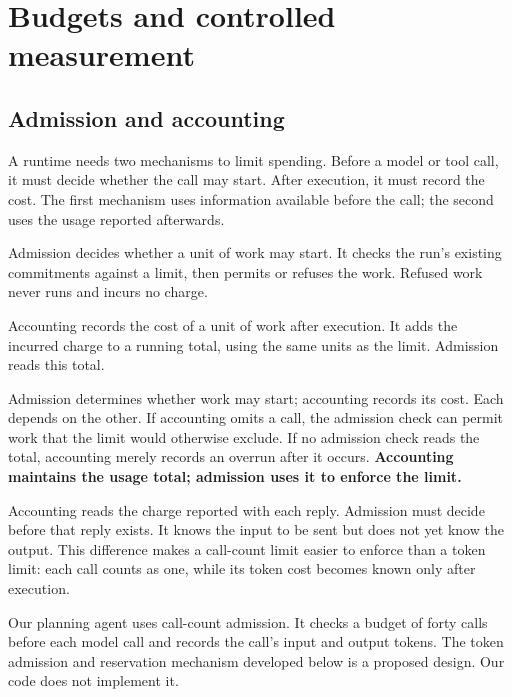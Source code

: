 \section{Budgets and controlled measurement}
\label{sec:budgets}

\subsection{Admission and accounting}
\label{sec:budgets-admission}

A runtime needs two mechanisms to limit spending. Before a model or tool call, it must decide
whether the call may start. After execution, it must record the cost. The first mechanism uses
information available before the call; the second uses the usage reported afterwards.

\begin{definition}[Admission]
\label{def:admission}
Admission decides whether a unit of work may start. It checks the run's existing commitments
against a limit, then permits or refuses the work. Refused work never runs and incurs no charge.
\end{definition}

\begin{definition}[Accounting]
\label{def:accounting}
Accounting records the cost of a unit of work after execution. It adds the incurred charge to a
running total, using the same units as the limit. Admission reads this total.
\end{definition}

Admission determines whether work may start; accounting records its cost. Each depends on the
other. If accounting omits a call, the admission check can permit work that the limit would
otherwise exclude. If no admission check reads the total, accounting merely records an overrun
after it occurs. \textbf{Accounting maintains the usage total; admission uses it to enforce the
limit.}

Accounting reads the charge reported with each reply. Admission must decide before that reply
exists. It knows the input to be sent but does not yet know the output. This difference makes a
call-count limit easier to enforce than a token limit: each call counts as one, while its token
cost becomes known only after execution.

Our planning agent uses call-count admission. It checks a budget of forty calls before each model
call and records the call's input and output tokens. The token admission and reservation mechanism
developed below is a proposed design. Our code does not implement it.

